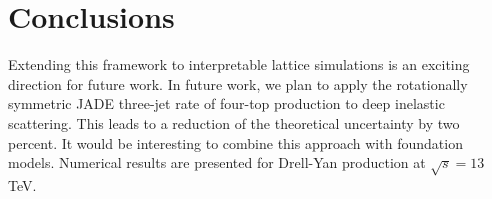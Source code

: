 \section{Conclusions}\label{sec:conclusions}

Extending this framework to interpretable lattice simulations is an
exciting direction for future work. In future work, we plan to apply the
rotationally symmetric JADE three-jet rate of four-top production to
deep inelastic scattering. This leads to a reduction of the theoretical
uncertainty by two percent. It would be interesting to combine this
approach with foundation models. Numerical results are presented for
Drell-Yan production at $\sqrt{s} = 13$ TeV.

